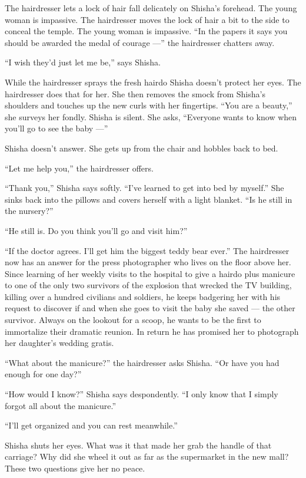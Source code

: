 \documentclass[twoside,11pt,openany]{book}
\begin{document}
The hairdresser lets a lock of hair fall delicately on Shisha's forehead. The young woman is impassive. The hairdresser
moves the lock of hair a bit to the side to conceal the temple. The young woman is
impassive.{ }``In the papers it says you should be awarded the
medal of courage ---'' the hairdresser chatters away.

``I wish they'd just let me be,'' says Shisha{.}

While the hairdresser sprays the fresh hairdo Shisha doesn't protect{ }her
eyes. The hairdresser does that for her. She then removes the smock from Shisha's shoulders and touches up the new
curls with her fingertips. ``You are a beauty,'' she surveys her fondly. Shisha is silent.
She asks, ``Everyone wants to know when you'll go to see the baby ---''

Shisha doesn't answer. She gets up from the chair and hobbles back to bed.

``Let me help you,'' the hairdresser offers.

``Thank you,'' Shisha says softly. ``I've learned to get into bed by
myself.'' She sinks back into the pillows and covers herself with a light blanket. ``Is he
still in the nursery?''

``He still is. Do you think you'll go and visit him?''

``If the doctor agrees. I'll get him the biggest teddy bear ever.'' The hairdresser now has an
answer for the press photographer who lives on the floor above her. Since learning of her weekly visits to the hospital
to give a hairdo plus manicure to one of the only two survivors of the explosion that wrecked the TV building, killing
over a hundred civilians and soldiers, he keeps badgering her with his request to discover if and when she goes to
visit the baby she saved --- the other survivor.
Always on the lookout for a scoop, he wants to be the first to
immortalize their dramatic reunion. In return he has promised her to photograph her daughter's wedding gratis.

``What about the manicure?'' the hairdresser asks Shisha. ``Or have you had
enough for one day?''

``How would I know?'' Shisha says despondently. ``I only know that I simply
forgot all about the manicure.''

``I'll get organized and you can rest meanwhile.''

Shisha shuts her eyes. What was it that made her grab the handle of that carriage? Why did she wheel it out as far as
the supermarket in the new mall? These two questions give her no peace.
\end{document}
